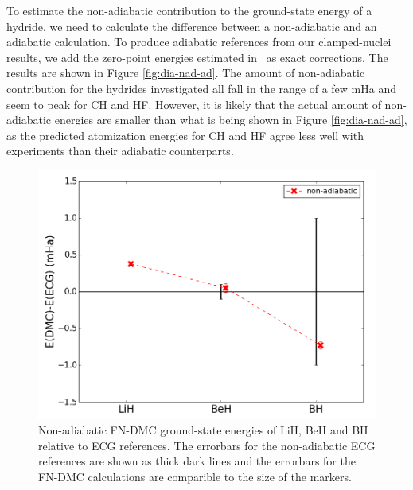 \documentclass[pra,superscriptaddress,groupedaddress,twocolumn]{revtex4}
\begin{document}
To estimate the non-adiabatic contribution to the ground-state energy of a hydride, we need to calculate the difference between a non-adiabatic and an adiabatic calculation. To produce adiabatic references from our clamped-nuclei results, we add the zero-point energies estimated in~\cite{Feller_Corrections} as exact corrections. The results are shown in Figure \ref{fig:dia-nad-ad}. The amount of non-adiabatic contribution for the hydrides investigated all fall in the range of a few mHa and seem to peak for CH and HF. However, it is likely that the actual amount of non-adiabatic energies are smaller than what is being shown in Figure \ref{fig:dia-nad-ad}, as the predicted atomization energies for CH and HF agree less well with experiments than their adiabatic counterparts.

\begin{figure}[h]
\centering
\includegraphics[scale=.4]{Figures/dia-ECG}
\caption{Non-adiabatic FN-DMC ground-state energies of LiH, BeH and BH relative to ECG references. The errorbars for the non-adiabatic ECG references are shown as thick dark lines and the errorbars for the FN-DMC calculations are comparible to the size of the markers. \label{fig:dia-ECG}}
\end{figure}
\end{document}
